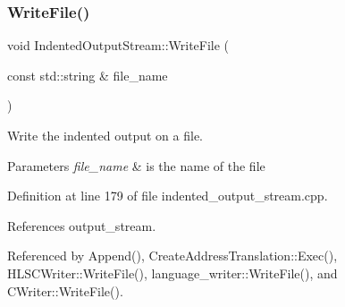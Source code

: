 \subsubsection{\texorpdfstring{Write\+File()}{WriteFile()}}
{\footnotesize\ttfamily void Indented\+Output\+Stream\+::\+Write\+File (\begin{DoxyParamCaption}\item[{const std\+::string \&}]{file\+\_\+name }\end{DoxyParamCaption})}



Write the indented output on a file. 


\begin{DoxyParams}{Parameters}
{\em file\+\_\+name} & is the name of the file \\
\hline
\end{DoxyParams}


Definition at line 179 of file indented\+\_\+output\+\_\+stream.\+cpp.



References output\+\_\+stream.



Referenced by Append(), Create\+Address\+Translation\+::\+Exec(), H\+L\+S\+C\+Writer\+::\+Write\+File(), language\+\_\+writer\+::\+Write\+File(), and C\+Writer\+::\+Write\+File().

